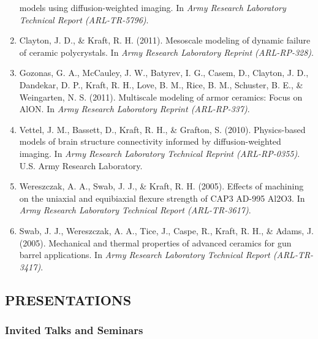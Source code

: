 \documentclass[11pt]{article}
\begin{document}
\begin{enumerate}
  models using diffusion-weighted imaging. 
In \emph{Army Research
  Laboratory Technical Report (ARL-TR-5796)}.
\item
  Clayton, J. 
D., \& Kraft, R. 
H. 
(2011). 
Mesoscale modeling of dynamic
  failure of ceramic polycrystals. 
In \emph{Army Research Laboratory
  Reprint (ARL-RP-328)}.
\item
  Gozonas, G. 
A., McCauley, J. 
W., Batyrev, I. 
G., Casem, D., Clayton,
  J. 
D., Dandekar, D. 
P., Kraft, R. 
H., Love, B. 
M., Rice, B. 
M.,
  Schuster, B. 
E., \& Weingarten, N. 
S. 
(2011). 
Multiscale modeling of
  armor ceramics: Focus on AlON. 
In \emph{Army Research Laboratory
  Reprint (ARL-RP-337)}.
\item
  Vettel, J. 
M., Bassett, D., Kraft, R. 
H., \& Grafton, S. 
(2010).
  Physics-based models of brain structure connectivity informed by
  diffusion-weighted imaging. 
In \emph{Army Research Laboratory
  Technical Reprint (ARL-RP-0355)}. 
U.S. 
Army Research Laboratory.
\item
  Wereszczak, A. 
A., Swab, J. 
J., \& Kraft, R. 
H. 
(2005). 
Effects of
  machining on the uniaxial and equibiaxial flexure strength of CAP3
  AD-995 Al2O3. 
In \emph{Army Research Laboratory Technical Report
  (ARL-TR-3617)}.
\item
  Swab, J. 
J., Wereszczak, A. 
A., Tice, J., Caspe, R., Kraft, R. 
H., \&
  Adams, J. 
(2005). 
Mechanical and thermal properties of advanced
  ceramics for gun barrel applications. 
In \emph{Army Research
  Laboratory Technical Report (ARL-TR-3417)}.
\end{enumerate}

\subsection{PRESENTATIONS}\label{presentations}

\subsubsection{Invited Talks and Seminars}\label{invited}
\end{document}
